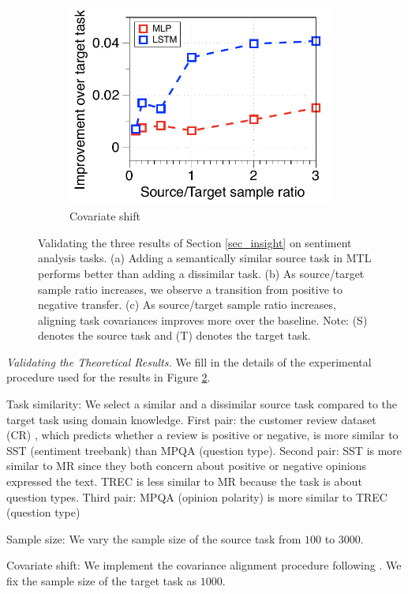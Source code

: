 \begin{figure}[!t]
\begin{subfigure}[b]{0.33\textwidth}
		\includegraphics[width=0.975\textwidth]{figures/ratio_alignment_norm_diff_all.pdf}
		\caption{Covariate shift}
		\label{fig_ab_cov}
	\end{subfigure}
	\caption{Validating the three results of Section \ref{sec_insight} on sentiment analysis tasks. (a) Adding a semantically similar source task in MTL performs better than adding a dissimilar task.
	(b) As source/target sample ratio increases, we observe a transition from positive to negative transfer.
	(c) As source/target sample ratio increases, aligning task covariances \cite{WZR20} improves more over the baseline.
	Note: (S) denotes the source task and (T) denotes the target task.}
	\label{fig_ablation}
	\vspace{-0.15in}
\end{figure}








\textit{Validating the Theoretical Results.}
We fill in the details of the experimental procedure used for the results in Figure \ref{fig_ablation}.
\squishlist
	\item Task similarity: We select a similar and a dissimilar source task compared to the target task using domain knowledge.
First pair: the customer review dataset (CR) , which predicts whether a review is positive or negative, is more similar to SST (sentiment treebank) than MPQA (question type).
Second pair: SST is more similar to MR since they both concern about positive or negative opinions expressed the text.
TREC is less similar to MR because the task is about question types.
Third pair: MPQA (opinion polarity) is more similar to TREC (question type)
	\item Sample size: We vary the sample size of the source task from $100$ to $3000$.
	\item Covariate shift: We implement the covariance alignment procedure following \cite{WZR20}.
	We fix the sample size of the target task as $1000$.
\squishend

